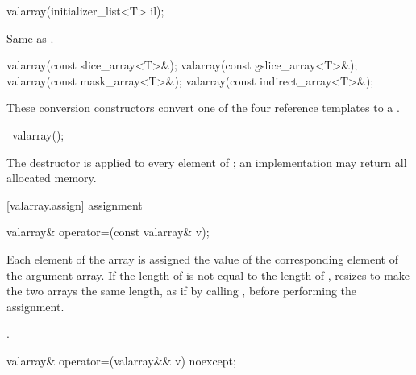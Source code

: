 %
\begin{itemdecl}
valarray(initializer_list<T> il);
\end{itemdecl}

\begin{itemdescr}
\pnum
\effects Same as .
\end{itemdescr}

%
\begin{itemdecl}
valarray(const slice_array<T>&);
valarray(const gslice_array<T>&);
valarray(const mask_array<T>&);
valarray(const indirect_array<T>&);
\end{itemdecl}

\begin{itemdescr}
\pnum
These conversion constructors convert one of the four reference templates
to a
.
\end{itemdescr}

%
\begin{itemdecl}
~valarray();
\end{itemdecl}

\begin{itemdescr}
\pnum
The destructor is applied to every element of
;
an implementation may return all allocated memory.
\end{itemdescr}

[valarray.assign]{ assignment}

%
\begin{itemdecl}
valarray& operator=(const valarray& v);
\end{itemdecl}

\begin{itemdescr}
\pnum
Each element of the
array is assigned the value of the corresponding element of the argument
array.
If the length of  is not equal to the length of 
, resizes  to make the two arrays the same length,
as if by calling , before performing the assignment.

\pnum
\postcondition {}.
\end{itemdescr}

%
\begin{itemdecl}
valarray& operator=(valarray&& v) noexcept;
\end{itemdecl}

